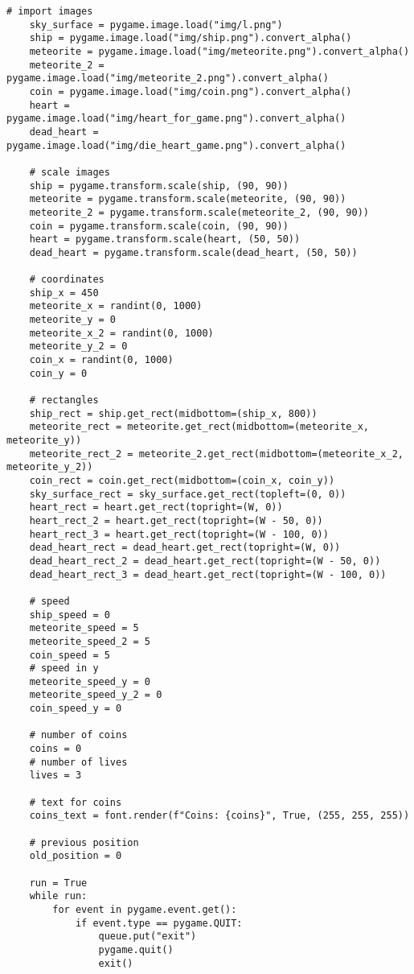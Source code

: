 \documentclass[12pt]{report}			%
\begin{document}
\begin{appendices}
\begin{lstlisting}[title={Program hra.py}, caption={hra.py},  label={lst:hra}]
    # import images
    sky_surface = pygame.image.load("img/l.png")
    ship = pygame.image.load("img/ship.png").convert_alpha()
    meteorite = pygame.image.load("img/meteorite.png").convert_alpha()
    meteorite_2 = pygame.image.load("img/meteorite_2.png").convert_alpha()
    coin = pygame.image.load("img/coin.png").convert_alpha()
    heart = pygame.image.load("img/heart_for_game.png").convert_alpha()
    dead_heart = pygame.image.load("img/die_heart_game.png").convert_alpha()

    # scale images
    ship = pygame.transform.scale(ship, (90, 90))
    meteorite = pygame.transform.scale(meteorite, (90, 90))
    meteorite_2 = pygame.transform.scale(meteorite_2, (90, 90))
    coin = pygame.transform.scale(coin, (90, 90))
    heart = pygame.transform.scale(heart, (50, 50))
    dead_heart = pygame.transform.scale(dead_heart, (50, 50))

    # coordinates
    ship_x = 450
    meteorite_x = randint(0, 1000)
    meteorite_y = 0
    meteorite_x_2 = randint(0, 1000)
    meteorite_y_2 = 0
    coin_x = randint(0, 1000)
    coin_y = 0

    # rectangles
    ship_rect = ship.get_rect(midbottom=(ship_x, 800))
    meteorite_rect = meteorite.get_rect(midbottom=(meteorite_x, meteorite_y))
    meteorite_rect_2 = meteorite_2.get_rect(midbottom=(meteorite_x_2, meteorite_y_2))
    coin_rect = coin.get_rect(midbottom=(coin_x, coin_y))
    sky_surface_rect = sky_surface.get_rect(topleft=(0, 0))
    heart_rect = heart.get_rect(topright=(W, 0))
    heart_rect_2 = heart.get_rect(topright=(W - 50, 0))
    heart_rect_3 = heart.get_rect(topright=(W - 100, 0))
    dead_heart_rect = dead_heart.get_rect(topright=(W, 0))
    dead_heart_rect_2 = dead_heart.get_rect(topright=(W - 50, 0))
    dead_heart_rect_3 = dead_heart.get_rect(topright=(W - 100, 0))

    # speed
    ship_speed = 0
    meteorite_speed = 5
    meteorite_speed_2 = 5
    coin_speed = 5
    # speed in y
    meteorite_speed_y = 0
    meteorite_speed_y_2 = 0
    coin_speed_y = 0

    # number of coins
    coins = 0
    # number of lives
    lives = 3

    # text for coins
    coins_text = font.render(f"Coins: {coins}", True, (255, 255, 255))

    # previous position
    old_position = 0

    run = True
    while run:
        for event in pygame.event.get():
            if event.type == pygame.QUIT:
                queue.put("exit")
                pygame.quit()
                exit()


\end{lstlisting}
\end{appendices}
\end{document}
